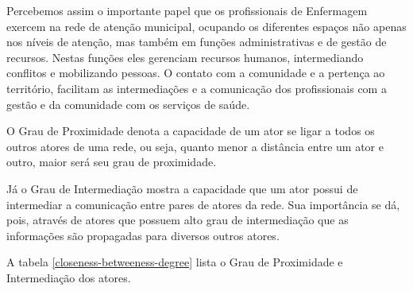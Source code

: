 Percebemos assim o importante papel que os profissionais de Enfermagem exercem na rede de atenção municipal, ocupando os diferentes espaços não apenas nos níveis de atenção, mas também em funções administrativas e de gestão de recursos. Nestas funções eles gerenciam recursos humanos, intermediando conflitos e mobilizando pessoas. O contato com a comunidade e a pertença ao território, facilitam as intermediações e a comunicação dos profissionais com a gestão e da comunidade com os serviços de saúde. 

O Grau de Proximidade denota a capacidade de um ator se ligar a todos os outros atores de uma rede, ou seja, quanto menor a distância entre um ator e outro, maior será seu grau de proximidade. 

Já o Grau de Intermediação mostra a capacidade que um ator possui de intermediar a comunicação entre pares de atores da rede. Sua importância se dá, pois, através de atores que possuem alto grau de intermediação que as informações são propagadas para diversos outros atores. 

A tabela \ref{closeness-betweeness-degree} lista o Grau de Proximidade e Intermediação dos atores.

